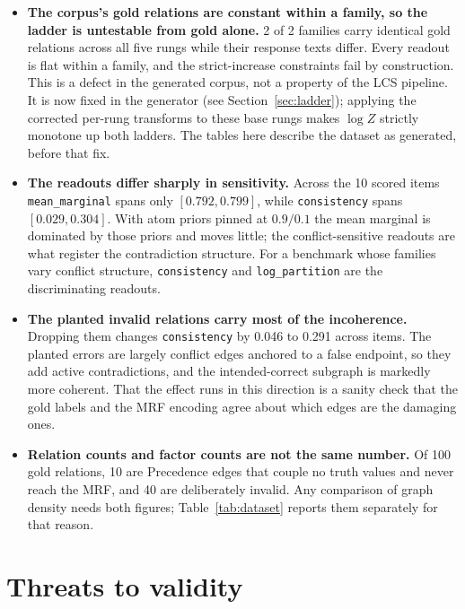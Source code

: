 \documentclass[11pt]{article}
\begin{document}
\begin{itemize}
\item \textbf{The corpus's gold relations are constant within a family, so the ladder is untestable from gold alone.} 2 of 2 families carry identical gold relations across all five rungs while their response texts differ. Every readout is flat within a family, and the strict-increase constraints fail by construction. This is a defect in the generated corpus, not a property of the LCS pipeline. It is now fixed in the generator (see Section~\ref{sec:ladder}); applying the corrected per-rung transforms to these base rungs makes $\log Z$ strictly monotone up both ladders. The tables here describe the dataset as generated, before that fix.
\item \textbf{The readouts differ sharply in sensitivity.} Across the 10 scored items \texttt{mean\_marginal} spans only $[0.792, 0.799]$, while \texttt{consistency} spans $[0.029, 0.304]$. With atom priors pinned at $0.9/0.1$ the mean marginal is dominated by those priors and moves little; the conflict-sensitive readouts are what register the contradiction structure. For a benchmark whose families vary conflict structure, \texttt{consistency} and \texttt{log\_partition} are the discriminating readouts.
\item \textbf{The planted invalid relations carry most of the incoherence.} Dropping them changes \texttt{consistency} by 0.046 to 0.291 across items. The planted errors are largely conflict edges anchored to a false endpoint, so they add active contradictions, and the intended-correct subgraph is markedly more coherent. That the effect runs in this direction is a sanity check that the gold labels and the MRF encoding agree about which edges are the damaging ones.
\item \textbf{Relation counts and factor counts are not the same number.} Of 100 gold relations, 10 are Precedence edges that couple no truth values and never reach the MRF, and 40 are deliberately invalid. Any comparison of graph density needs both figures; Table~\ref{tab:dataset} reports them separately for that reason.
\end{itemize}

\section{Threats to validity}
\end{document}
